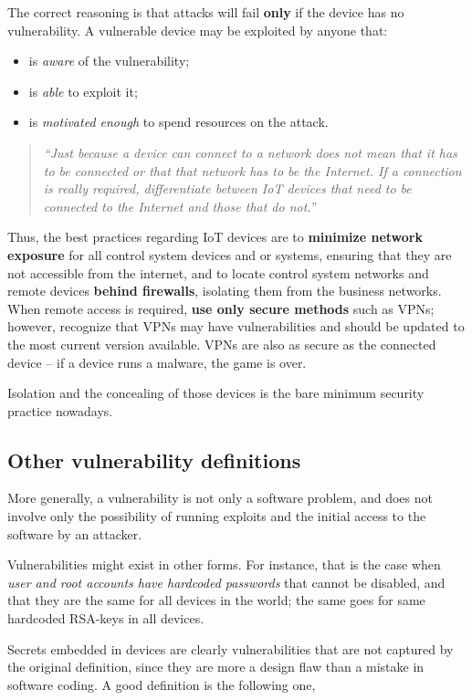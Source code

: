 \documentclass[10pt]{extbook}
\begin{document}
The correct reasoning is that attacks will fail \textbf{only} if the device has
no vulnerability. A vulnerable device may be exploited by anyone that:
\begin{itemize}
    \item is \emph{aware} of the vulnerability;
    \item is \emph{able} to exploit it;
    \item is \emph{motivated enough} to spend resources on the attack.
\end{itemize}

\begin{quote}
\emph{``Just because a device can connect to a network does not mean that it has to be
connected or that that network has to be the Internet. If a connection is
really required, differentiate between IoT devices that need to be connected to
the Internet and those that do not.''}
\end{quote}

Thus, the best practices regarding IoT devices are to \textbf{minimize network
exposure} for all control system devices and or systems, ensuring that they are
not accessible from the internet, and to locate control system networks and
remote devices \textbf{behind firewalls}, isolating them from the business
networks. When remote access is required, \textbf{use only secure methods} such
as VPNs; however, recognize that VPNs may have vulnerabilities and should be
updated to the most current version available. VPNs are also as secure as the
connected device -- if a device runs a malware, the game is over.

Isolation and the concealing of those devices is the bare minimum security
practice nowadays.


\subsection{Other vulnerability definitions}

More generally, a vulnerability is not only a software problem, and does not
involve only the possibility of running exploits and the initial access to the
software by an attacker.

Vulnerabilities might exist in other forms. For instance, that is the case when
\emph{user and root accounts have hardcoded passwords} that cannot be disabled,
and that they are the same for all devices in the world; the same goes for same
hardcoded RSA-keys in all devices.

Secrets embedded in devices are clearly vulnerabilities that are not captured
by the original definition, since they are more a design flaw than a mistake in
software coding. A good definition is the following one,
\end{document}

